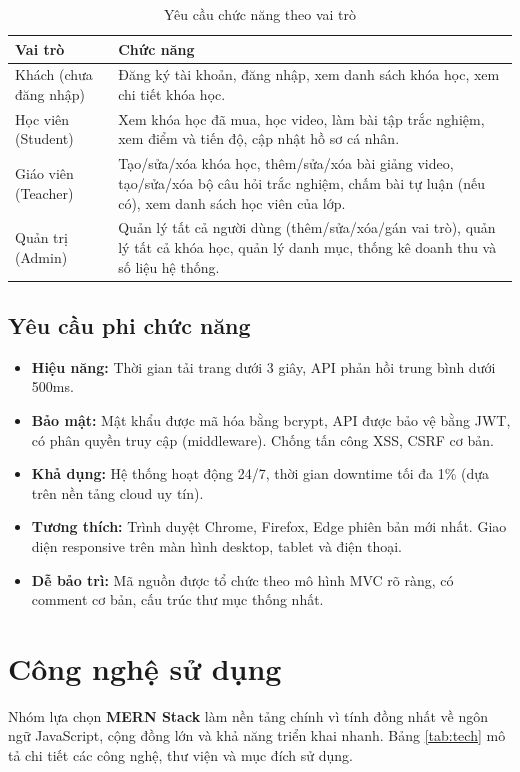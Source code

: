 \begin{table}[H]
\centering
\caption{Yêu cầu chức năng theo vai trò}
\label{tab:functional}
\begin{tabular}{|p{2.5cm}|p{10cm}|}
\hline
\textbf{Vai trò} & \textbf{Chức năng} \\ \hline
Khách (chưa đăng nhập) & Đăng ký tài khoản, đăng nhập, xem danh sách khóa học, xem chi tiết khóa học. \\ \hline
Học viên (Student) & Xem khóa học đã mua, học video, làm bài tập trắc nghiệm, xem điểm và tiến độ, cập nhật hồ sơ cá nhân. \\ \hline
Giáo viên (Teacher) & Tạo/sửa/xóa khóa học, thêm/sửa/xóa bài giảng video, tạo/sửa/xóa bộ câu hỏi trắc nghiệm, chấm bài tự luận (nếu có), xem danh sách học viên của lớp. \\ \hline
Quản trị (Admin) & Quản lý tất cả người dùng (thêm/sửa/xóa/gán vai trò), quản lý tất cả khóa học, quản lý danh mục, thống kê doanh thu và số liệu hệ thống. \\ \hline
\end{tabular}
\end{table}

\subsection{Yêu cầu phi chức năng}
\begin{itemize}
    \item \textbf{Hiệu năng:} Thời gian tải trang dưới 3 giây, API phản hồi trung bình dưới 500ms.
    \item \textbf{Bảo mật:} Mật khẩu được mã hóa bằng bcrypt, API được bảo vệ bằng JWT, có phân quyền truy cập (middleware). Chống tấn công XSS, CSRF cơ bản.
    \item \textbf{Khả dụng:} Hệ thống hoạt động 24/7, thời gian downtime tối đa 1\% (dựa trên nền tảng cloud uy tín).
    \item \textbf{Tương thích:} Trình duyệt Chrome, Firefox, Edge phiên bản mới nhất. Giao diện responsive trên màn hình desktop, tablet và điện thoại.
    \item \textbf{Dễ bảo trì:} Mã nguồn được tổ chức theo mô hình MVC rõ ràng, có comment cơ bản, cấu trúc thư mục thống nhất.
\end{itemize}

\section{Công nghệ sử dụng}
Nhóm lựa chọn \textbf{MERN Stack} làm nền tảng chính vì tính đồng nhất về ngôn ngữ JavaScript, cộng đồng lớn và khả năng triển khai nhanh. Bảng \ref{tab:tech} mô tả chi tiết các công nghệ, thư viện và mục đích sử dụng.

